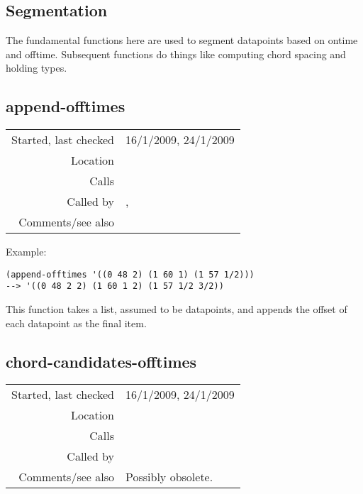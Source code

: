 \subsection{Segmentation}\label{sec:segmentation}

The fundamental functions here are used to segment
datapoints based on ontime and offtime. Subsequent
functions do things like computing chord spacing and
holding types.


\subsection*{append-offtimes}\label{fun:append-offtimes}

\vspace{0.3cm}
\begin{tabular}{r|p{8cm}}
Started, last checked & 16/1/2009, 24/1/2009 \\
Location & \nameref{sec:segmentation} \\
Calls & \\
Called by & \nameref{fun:segments}, \nameref{fun:segments-strict} \\
Comments/see also &
\end{tabular}

\vspace{0.5cm}
\noindent Example:
\begin{verbatim}
(append-offtimes '((0 48 2) (1 60 1) (1 57 1/2)))
--> '((0 48 2 2) (1 60 1 2) (1 57 1/2 3/2))
\end{verbatim}

\noindent This function takes a list, assumed to be
datapoints, and appends the offset of each datapoint
as the final item.


\subsection*{chord-candidates-offtimes}\label{fun:chord-candidates-offtimes}

\vspace{0.3cm}
\begin{tabular}{r|p{8cm}}
Started, last checked & 16/1/2009, 24/1/2009 \\
Location & \nameref{sec:segmentation} \\
Calls & \nameref{fun:my-last} \\
Called by & \nameref{fun:segment} \\
Comments/see also & Possibly obsolete.
\end{tabular}

